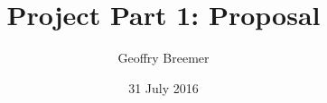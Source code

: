\newcommand{\usqcoursecode}{CSC8003}
\newcommand{\usqcoursedescription}{Machine Learning}
\title{Project Part 1: Proposal}
\newcommand{\usqsubtitle}{}
\author{Geoffry Breemer}
\newcommand{\usqstudentnumber}{0061082147}
\newcommand{\usqstudentemail}{u1082147@umail.usq.edu.au}
\newcommand{\usqacademicyear}{2016}
\newcommand{\usqacademicsemester}{2}
\date{31 July 2016}
\newcommand{\usqpreparedfor}{Mr Tianning Li}
\newcommand{\usqpreparedforposition}{Assistant examiner}
\newcommand{\usqpreparedfororganisation}{School of Agricultural, Computational and Environmental Sciences}